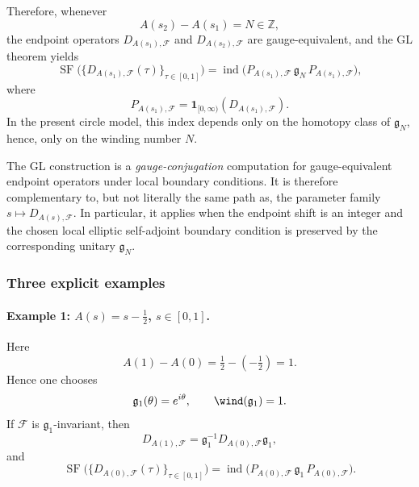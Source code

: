 \documentclass[11pt]{article}
\theoremstyle{definition}
\DeclareMathOperator{\ind}{ind}
\numberwithin{equation}{section}
\begin{document}
Therefore, whenever
\begin{equation}
A(s_2)-A(s_1)=N\in\mathbb Z,
\end{equation}
the endpoint operators \(D_{A(s_1),\mathcal F}\) and \(D_{A(s_2),\mathcal F}\) are gauge-equivalent, and the GL theorem yields
\begin{equation}\label{eq:GL_takeaway}
\operatorname{SF}\bigl(\{D_{A(s_1),\mathcal F}(\tau)\}_{\tau\in[0,1]}\bigr)
=
\ind\!\bigl(P_{A(s_1),\mathcal F}\,\mathfrak g_N\,P_{A(s_1),\mathcal F}\bigr),
\end{equation}
where
\begin{equation}
P_{A(s_1),\mathcal F}=\mathbf 1_{[0,\infty)}(D_{A(s_1),\mathcal F}).
\end{equation}
In the present circle model, this index depends only on the homotopy class of \(\mathfrak g_N\), hence, only on the winding number \(N\).


The GL construction is a \emph{gauge-conjugation} computation for gauge-equivalent endpoint operators under local boundary conditions. It is therefore complementary to, but not literally the same path as, the parameter family \(s\mapsto D_{A(s),\mathcal F}\). In particular, it applies when the endpoint shift is an integer and the chosen local elliptic self-adjoint boundary condition is preserved by the corresponding unitary \(\mathfrak g_N\).

\subsubsection*{Three explicit examples}

\paragraph{Example 1: \(A(s)=s-\tfrac12\), \(s\in[0,1]\).}
Here
\begin{equation}
A(1)-A(0)=\tfrac12-(-\tfrac12)=1.
\end{equation}
Hence one chooses
\begin{equation}
\mathfrak g_1(\theta)=e^{i\theta},
\qquad
\wind(\mathfrak g_1)=1.
\end{equation}
If \(\mathcal F\) is \(\mathfrak g_1\)-invariant, then
\begin{equation}
D_{A(1),\mathcal F}
=
\mathfrak g_1^{-1}D_{A(0),\mathcal F}\mathfrak g_1,
\end{equation}
and
\begin{equation}
\operatorname{SF}\bigl(\{D_{A(0),\mathcal F}(\tau)\}_{\tau\in[0,1]}\bigr)
=
\ind\!\bigl(P_{A(0),\mathcal F}\,\mathfrak g_1\,P_{A(0),\mathcal F}\bigr).
\end{equation}
\end{document}
